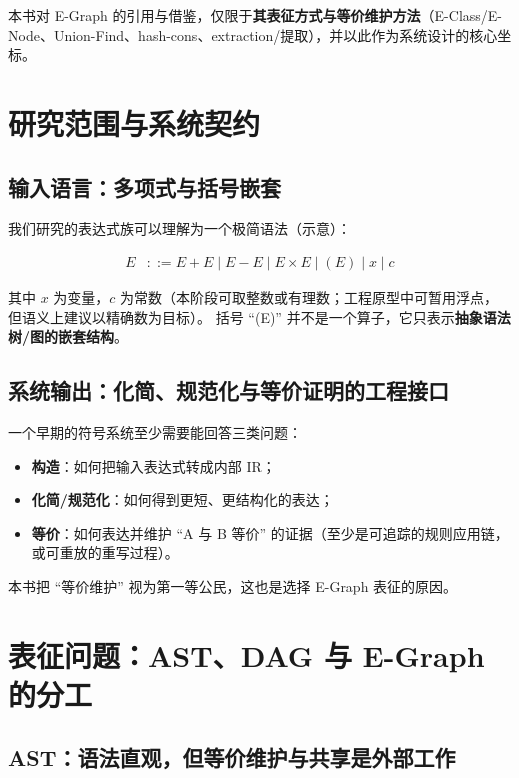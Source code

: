 \documentclass[12pt,openany]{book}
\begin{document}
本书对 E-Graph 的引用与借鉴，仅限于\textbf{其表征方式与等价维护方法}（E-Class/E-Node、Union-Find、hash-cons、extraction/提取），并以此作为系统设计的核心坐标。

\tableofcontents
\thispagestyle{plain}

\mainmatter

\chapter{研究范围与系统契约}

\section{输入语言：多项式与括号嵌套}

我们研究的表达式族可以理解为一个极简语法（示意）：

\begin{align*}
E &::= E + E \mid E - E \mid E \times E \mid (E) \mid x \mid c
\end{align*}

其中 $x$ 为变量，$c$ 为常数（本阶段可取整数或有理数；工程原型中可暂用浮点，但语义上建议以精确数为目标）。
括号 ``(E)'' 并不是一个算子，它只表示\textbf{抽象语法树/图的嵌套结构}。

\section{系统输出：化简、规范化与等价证明的工程接口}

一个早期的符号系统至少需要能回答三类问题：

\begin{itemize}
  \item \textbf{构造}：如何把输入表达式转成内部 IR；
  \item \textbf{化简/规范化}：如何得到更短、更结构化的表达；
  \item \textbf{等价}：如何表达并维护 ``A 与 B 等价'' 的证据（至少是可追踪的规则应用链，或可重放的重写过程）。
\end{itemize}

本书把 ``等价维护'' 视为第一等公民，这也是选择 E-Graph 表征的原因。

\chapter{表征问题：AST、DAG 与 E-Graph 的分工}

\section{AST：语法直观，但等价维护与共享是外部工作}
\end{document}
